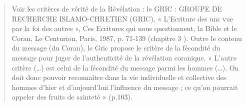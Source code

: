 \begin{quote}
    Voir les critères de vérité de la Révélation : le GRIC : GROUPE DE RECHERCHE
ISLAMO-CHRETIEN (GRIC), « L’Ecriture des uns vue par la foi des autres », Ces Ecritures
qui nous questionnent, la Bible et le Coran, Le Centurion, Paris, 1987, p. 71-139 (chapitre 3 ).
Outre le contenu du message (du Coran), le Gric propose le critère de la fécondité du message
pour juger de l’authenticité de la révélation coranique. « L’autre critère (…) est celui de la
fécondité du message parmi les hommes (…). On doit donc pouvoir reconnaître dans la vie
individuelle et collective des hommes d’hier et d’aujourd’hui l’influence du message ; ce
qu’on pourrait appeler des fruits de sainteté » (p.103).
\end{quote}

 

